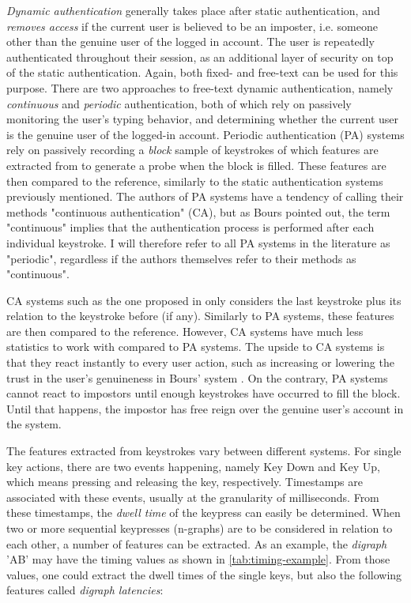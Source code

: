 \documentclass[informationsecurity]{gucmasterproject}
\begin{document}
\textit{Dynamic authentication} generally takes place after static authentication, and \textit{removes access} if the current user is believed to be an imposter, i.e. someone other than the genuine user of the logged in account.
The user is repeatedly authenticated throughout their session, as an additional layer of security on top of the static authentication.
Again, both fixed- and free-text can be used for this purpose.
There are two approaches to free-text dynamic authentication, namely \textit{continuous} and \textit{periodic} authentication, both of which rely on passively monitoring the user's typing behavior, and determining whether the current user is the genuine user of the logged-in account.
Periodic authentication (PA) systems rely on passively recording a \textit{block} sample of keystrokes of which features are extracted from to generate a probe when the block is filled.
These features are then compared to the reference, similarly to the static authentication systems previously mentioned.
The authors of PA systems have a tendency of calling their methods "continuous authentication" (CA), but as Bours \cite{BOURS201236} pointed out, the term "continuous" implies that the authentication process is performed after each individual keystroke.
I will therefore refer to all PA systems in the literature as "periodic", regardless if the authors themselves refer to their methods as "continuous".

CA systems such as the one proposed in \cite{BOURS201236} only considers the last keystroke plus its relation to the keystroke before (if any).
Similarly to PA systems, these features are then compared to the reference. 
However, CA systems have much less statistics to work with compared to PA systems.
The upside to CA systems is that they react instantly to every user action, such as increasing or lowering the trust in the user's genuineness in Bours' system \cite{BOURS201236}.
On the contrary, PA systems cannot react to impostors until enough keystrokes have occurred to fill the block.
Until that happens, the impostor has free reign over the genuine user's account in the system.

The features extracted from keystrokes vary between different systems.
For single key actions, there are two events happening, namely Key Down and Key Up, which means pressing and releasing the key, respectively.
Timestamps are associated with these events, usually at the granularity of milliseconds.
From these timestamps, the \textit{dwell time} of the keypress can easily be determined.
When two or more sequential keypresses (n-graphs) are to be considered in relation to each other, a number of features can be extracted.
As an example, the \textit{digraph} 'AB' may have the timing values as shown in \cref{tab:timing-example}.
From those values, one could extract the dwell times of the single keys, but also the following features called \textit{digraph latencies}: 
\end{document}
